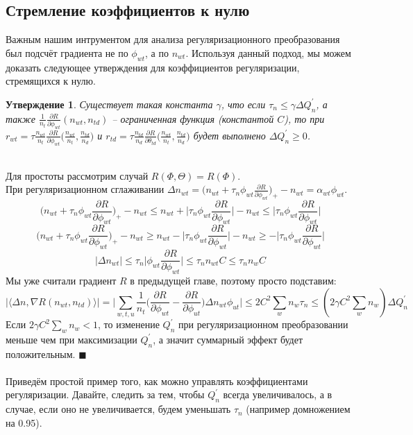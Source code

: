 \documentclass[12pt]{article}
\newtheorem{claim}[remark]{Утверждение}
\newenvironment{Proof} 
	{\par\noindent{\bf Доказательство.}} 
	{\hfill$\blacksquare$}
\renewcommand{\leq}{\leqslant}
\renewcommand{\geq}{\geqslant}
\begin{document}
           \subsection{Стремление коэффициентов к нулю}
Важным нашим интрументом для анализа регуляризационного преобразования был подсчёт градиента не по $\phi_{wt}$, а по $n_{wt}$. Используя данный подход, мы можем доказать следующее утверждения для коэффициентов регуляризации, стремящихся к нулю.\\
\begin{claim}
Существует такая константа $\gamma$, что если $\tau_n \leq \gamma \Delta Q^{\prime}_n$, а также $\frac{1}{n_t} \frac{\partial{R}}{\partial{\phi_{wt}}}(n_{wt}, n_{td})$ -- ограниченная функция (константой $C$), то при $r_{wt} = \tau \frac{n_{wt}}{n_t} \frac{\partial{R}}{\partial{\phi_{wt}}} \biggl(\frac{n_{wt}}{n_t}, \frac{n_{td}}{n_d}\biggr)$ и $r_{td}= \tau \frac{n_{td}}{n_d} \frac{\partial{R}}{\partial{\theta_{td}}} \biggl(\frac{n_{wt}}{n_t}, \frac{n_{td}}{n_d}\biggr)$ будет выполнено $\Delta Q^{\prime}_n \geq 0$.
\end{claim}
\begin{Proof}
\ \\
Для простоты рассмотрим случай $R(\Phi, \Theta) = R(\Phi)$. \\
При регуляризационном сглаживании  $\Delta n_{wt} = \bigg( n_{wt} + \tau_n \phi_{wt} \frac{\partial{R}}{\partial{\phi_{wt}}}\bigg)_{+} - n_{wt} = \alpha_{wt} \phi_{wt}$.\\
\[
\bigg( n_{wt} + \tau_n \phi_{wt} \frac{\partial{R}}{\partial{\phi_{wt}}}\bigg)_{+} - n_{wt} \leq  n_{wt} +\bigg| \tau_n \phi_{wt} \frac{\partial{R}}{\partial{\phi_{wt}}}\bigg| - n_{wt} \leq \bigg| \tau_n \phi_{wt} \frac{\partial{R}}{\partial{\phi_{wt}}}\bigg|
\]
\[
\bigg( n_{wt} + \tau_n \phi_{wt} \frac{\partial{R}}{\partial{\phi_{wt}}}\bigg)_{+} - n_{wt} \geq  n_{wt} - \bigg| \tau_n \phi_{wt} \frac{\partial{R}}{\partial{\phi_{wt}}}\bigg| - n_{wt} \geq - \bigg| \tau_n \phi_{wt} \frac{\partial{R}}{\partial{\phi_{wt}}}\bigg|
\]
\[
|\Delta n_{wt} | \leq \tau_n\bigg|  \phi_{wt} \frac{\partial{R}}{\partial{\phi_{wt}}}\bigg| \leq \tau_n n_{wt} C \leq \tau_n n_{w} C
\]
Мы уже считали градиент $R$ в предыдущей главе, поэтому просто подставим:
\[
 \bigg|\langle\Delta n, \nabla R(n_{wt}, n_{td}) \rangle\bigg| = \bigg| \sum\limits_{w, t, u}  \frac{1}{n_{t}}  \bigg(  \frac{\partial{R}}{\partial{\phi_{wt}}}  -  \frac{\partial{R}}{\partial{\phi_{ut}}}  \bigg)  \Delta n_{wt}  \phi_{ut} \bigg| \leq 2C^2\sum_w n_w  \tau_n \leq (2 \gamma C^2\sum_w n_w) \Delta Q^{\prime}_n
\]
Если $ 2 \gamma C^2 \sum_w n_w < 1$, то изменение $Q^{\prime}_n$ при регуляризационном преобразовании меньше чем при максимизации $Q^{\prime}_n$, а значит суммарный эффект будет положительным.
\end{Proof}\ \\
\ \\
Приведём простой пример того, как можно управлять коэффициентами регуляризации. Давайте, следить за тем, чтобы $Q^{\prime}_n$ всегда увеличивалось, а в случае, если оно не увеличивается, будем уменьшать $\tau_n$ (например домножением на 0.95).
\end{document}
